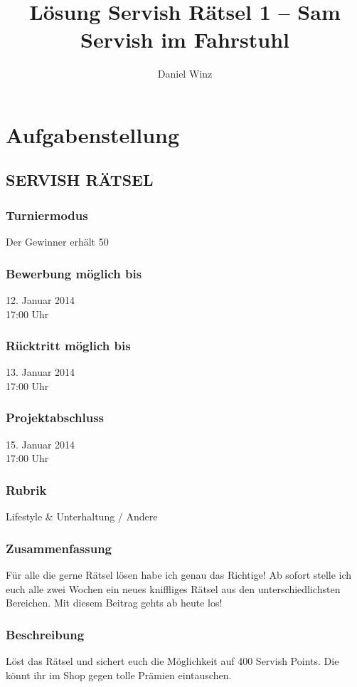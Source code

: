\documentclass[10pt, fleqn]{article}
\title{Lösung Servish Rätsel 1 -- Sam Servish im Fahrstuhl}
\author{Daniel Winz}
\begin{document}
\vfill
\maketitle
\vfill
\tableofcontents
\vfill
\newpage

\section{Aufgabenstellung}
\subsection*{SERVISH RÄTSEL}
\subsubsection*{Turniermodus}
Der Gewinner erhält 50%

\subsubsection*{Bewerbung möglich bis}
12. Januar 2014 \\
17:00 Uhr

\subsubsection*{Rücktritt möglich bis}
13. Januar 2014 \\
17:00 Uhr

\subsubsection*{Projektabschluss}
15. Januar 2014 \\
17:00 Uhr

\subsubsection*{Rubrik}
Lifestyle \& Unterhaltung / Andere

\subsubsection*{Zusammenfassung}
Für alle die gerne Rätsel lösen habe ich genau das Richtige! Ab sofort stelle 
ich euch alle zwei Wochen ein neues kniffliges Rätsel aus den 
unterschiedlichsten Bereichen. Mit diesem Beitrag gehts ab heute los!

\subsubsection*{Beschreibung}
Löst das Rätsel und sichert euch die Möglichkeit auf 400 Servish Points. Die 
könnt ihr im Shop gegen tolle Prämien eintauschen.
\end{document}
